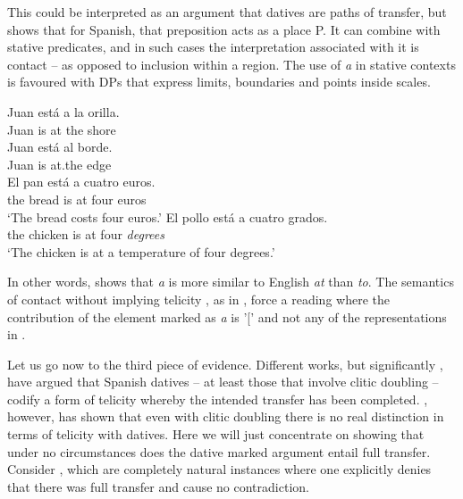 \documentclass[output=paper,colorlinks,citecolor=brown,nonflat]{./langscibook}
\begin{document}
This could be interpreted as an argument that datives are paths of transfer, but \citet{Fábregas2007} shows that for Spanish, that preposition acts as a place P. It can combine with stative predicates, and in such cases the interpretation associated with it is contact – as opposed to inclusion within a region. The use of \textit{a} in stative contexts is favoured with DPs that express limits, boundaries and points inside scales.

\ea%
    \label{ex:fabregas:22}
    \ea\label{ex:fabregas:22a}
    \gll    Juan está a   la    orilla.\\
            {Juan} {is}    {at} {the} {shore}\\
    \ex\label{ex:fabregas:22b}
    \gll    Juan está al      borde.\\
            {Juan} {is}    {at.the} {edge}\\
    \ex\label{ex:fabregas:22c}
    \gll    El   pan    está   a  cuatro   euros.\\
            {the} {bread} {is}   {at} {four}    {euros}\\
    \glt `The bread costs four euros.'  
    \ex\label{ex:fabregas:22d}
    \gll    El   pollo     está a cuatro grados.\\
            {the}  {chicken}   {is}    {at} {four}     \textit{degrees}\\
    \glt `The chicken is at a temperature of four degrees.' 
    \z
\z

In other words,  shows that \textit{a} is more similar to English \textit{at} than \textit{to}. The semantics of contact without implying telicity \citep{MarínMcNally2011}, as in , force a reading where the contribution of the element marked as \textit{a} is '[' and not any of the representations in . 

Let us go now to the third piece of evidence. Different works, but significantly \citet{RomeroMorales1997}, have argued that Spanish datives – at least those that involve clitic doubling – codify a form of telicity whereby the intended transfer has been completed. \citet{Pineda2016}, however, has shown that even with clitic doubling there is no real distinction in terms of telicity with datives. Here we will just concentrate on showing that under no circumstances does the dative marked argument entail full transfer. Consider , which are completely natural instances where one explicitly denies that there was full transfer and cause no contradiction. 
\end{document}
